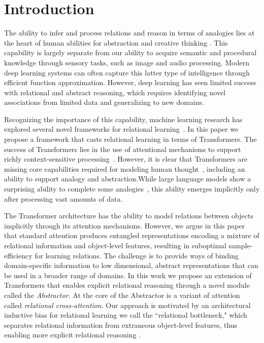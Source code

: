 \section{Introduction}

The ability to infer and process relations and reason in terms of analogies lies at the heart of human abilities for abstraction and creative thinking
\citep{snow,holyoak}. This capability is largely separate from our ability to acquire semantic and procedural knowledge through sensory tasks, such as image and audio processing. Modern deep learning systems can often capture this latter type of intelligence through efficient function approximation. However, deep learning has seen limited success with relational and abstract reasoning, which requires identifying novel associations from limited data and generalizing to new domains.

Recognizing the importance of this capability, machine learning research has explored several novel frameworks for relational learning~\citep{TEM, NTM,episodicControl,shanahanExplicitlyRelationalNeural,esbn,mondal23learned,battaglia,barrett:2018,santoro1}. In this paper we propose a framework that casts relational learning in terms of Transformers. The success of Transformers lies in the use of attentional mechanisms to support richly context-sensitive processing~\citep{transformers,vaswani2017attention,kerg2020untangling}. However, it is clear that Transformers are missing core capabilities required for modeling human thought~\citep{mahowald2023dissociating}, including an ability to support analogy and abstraction.While large language models show a surprising ability to complete some analogies~\citep{webb}, this ability emerges implicitly only after processing vast amounts of data.

The Transformer architecture has the ability to model relations between objects implicitly through its attention mechanisms. However, we argue in this paper that standard attention produces entangled representations encoding a mixture of relational information and object-level features, resulting in suboptimal sample-efficiency for learning relations. The challenge is to provide ways of binding domain-specific information to low dimensional, abstract representations that can be used in a broader range of domains. In this work we propose an extension of Transformers that enables explicit relational reasoning through a novel module called the \textit{Abstractor}. At the core of the Abstractor is a variant of attention called \textit{relational cross-attention}. Our approach is motivated by an architectural inductive bias for relational learning we call the ``relational bottleneck," which separates relational information from extraneous object-level features, thus enabling more explicit relational reasoning \citep{webb2023relational}. %


